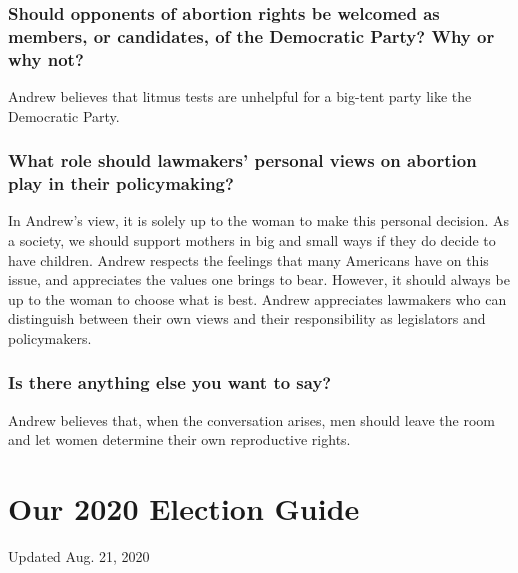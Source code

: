\hypertarget{should-opponents-of-abortion-rights-be-welcomed-as-members-or-candidates-of-the-democratic-party-why-or-why-not-9}{%
\subsubsection{Should opponents of abortion rights be welcomed as
members, or candidates, of the Democratic Party? Why or why
not?}\label{should-opponents-of-abortion-rights-be-welcomed-as-members-or-candidates-of-the-democratic-party-why-or-why-not-9}}

Andrew believes that litmus tests are unhelpful for a big-tent party
like the Democratic Party.

\hypertarget{what-role-should-lawmakers-personal-views-on-abortion-play-in-their-policymaking-9}{%
\subsubsection{What role should lawmakers' personal views on abortion
play in their
policymaking?}\label{what-role-should-lawmakers-personal-views-on-abortion-play-in-their-policymaking-9}}

In Andrew's view, it is solely up to the woman to make this personal
decision. As a society, we should support mothers in big and small ways
if they do decide to have children. Andrew respects the feelings that
many Americans have on this issue, and appreciates the values one brings
to bear. However, it should always be up to the woman to choose what is
best. Andrew appreciates lawmakers who can distinguish between their own
views and their responsibility as legislators and policymakers.

\hypertarget{is-there-anything-else-you-want-to-say-9}{%
\subsubsection{Is there anything else you want to
say?}\label{is-there-anything-else-you-want-to-say-9}}

Andrew believes that, when the conversation arises, men should leave the
room and let women determine their own reproductive rights.

\hypertarget{our-2020-election-guide}{%
\section{Our 2020 Election Guide}\label{our-2020-election-guide}}

Updated Aug. 21, 2020

